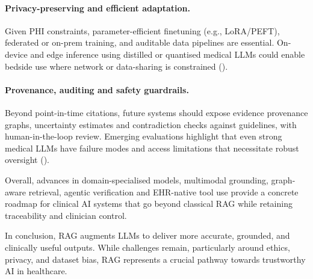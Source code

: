 \paragraph{Privacy-preserving and efficient adaptation.}
Given PHI constraints, parameter-efficient finetuning (e.g., LoRA/PEFT), federated or on-prem training, and auditable data pipelines are essential. On-device and edge inference using distilled or quantised medical LLMs could enable bedside use where network or data-sharing is constrained (\citep{chen2023meditron}).

\paragraph{Provenance, auditing and safety guardrails.}
Beyond point-in-time citations, future systems should expose evidence provenance graphs, uncertainty estimates and contradiction checks against guidelines, with human-in-the-loop review. Emerging evaluations highlight that even strong medical LLMs have failure modes and access limitations that necessitate robust oversight (\citep{nature2024evallimits}).

Overall, advances in domain-specialised models, multimodal grounding, graph-aware retrieval, agentic verification and EHR-native tool use provide a concrete roadmap for clinical AI systems that go beyond classical RAG while retaining traceability and clinician control.

In conclusion, RAG augments LLMs to deliver more accurate, grounded, and clinically useful outputs. While challenges remain, particularly around ethics, privacy, and dataset bias, RAG represents a crucial pathway towards trustworthy AI in healthcare.
